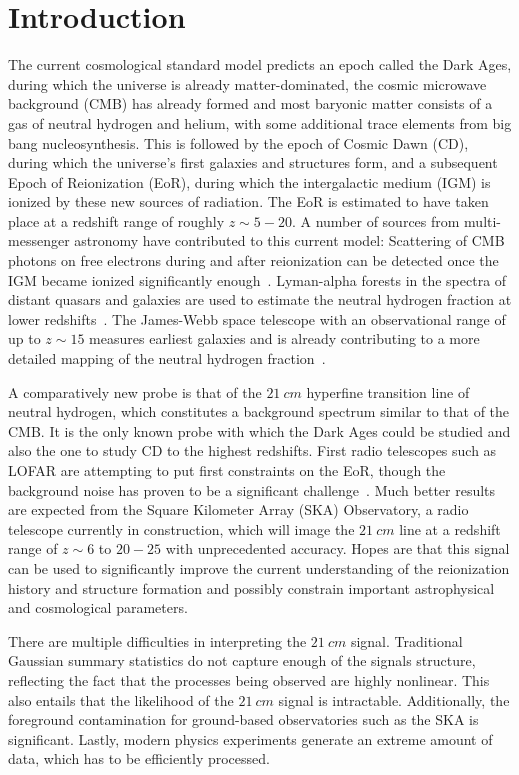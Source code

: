 \section{Introduction}

The current cosmological standard model predicts an epoch called the Dark Ages, during which the universe is already matter-dominated, the cosmic microwave background (CMB) has already formed and most baryonic matter consists of a gas of neutral hydrogen and helium, with some additional trace elements from big bang nucleosynthesis. This is followed by the epoch of Cosmic Dawn (CD), during which the universe's first galaxies and structures form, and a subsequent Epoch of Reionization (EoR), during which the intergalactic medium (IGM) is ionized by these new sources of radiation. The EoR is estimated to have taken place at a redshift range of roughly $z \sim 5-20$. A number of sources from multi-messenger astronomy have contributed to this current model: Scattering of CMB photons on free electrons during and after reionization can be detected once the IGM became ionized significantly enough~\cite{planck_2018}. Lyman-alpha forests in the spectra of distant quasars and galaxies are used to estimate the neutral hydrogen fraction at lower redshifts~\cite{fan_2006}. The James-Webb space telescope with an observational range of up to $z \sim 15$ measures earliest galaxies and is already contributing to a more detailed mapping of the neutral hydrogen fraction~\cite{meyer_2025}.

A comparatively new probe is that of the $21~\si{cm}$ hyperfine transition line of neutral hydrogen, which constitutes a background spectrum similar to that of the CMB. It is the only known probe with which the Dark Ages could be studied and also the one to study CD to the highest redshifts. First radio telescopes such as LOFAR are attempting to put first constraints on the EoR, though the background noise has proven to be a significant challenge~\cite{lofar}. Much better results are expected from the Square Kilometer Array (SKA) Observatory, a radio telescope currently in construction, which will image the $21~\si{cm}$ line at a redshift range of $z \sim 6$ to $20-25$ with unprecedented accuracy. Hopes are that this signal can be used to significantly improve the current understanding of the reionization history and structure formation and possibly constrain important astrophysical and cosmological parameters. 

There are multiple difficulties in interpreting the $21~\si{cm}$ signal. Traditional Gaussian summary statistics do not capture enough of the signals structure, reflecting the fact that the processes being observed are highly nonlinear. This also entails that the likelihood of the $21~\si{cm}$ signal is intractable. Additionally, the foreground contamination for ground-based observatories such as the SKA is significant. Lastly, modern physics experiments generate an extreme amount of data, which has to be efficiently processed.

